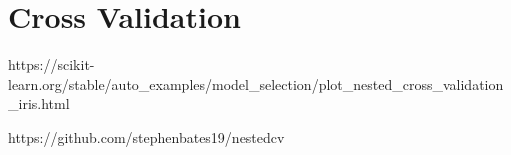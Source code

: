 \documentclass[../../main.tex]{subfiles}
\begin{document}

\section{Cross Validation}

https://scikit-learn.org/stable/auto_examples/model_selection/plot_nested_cross_validation_iris.html

https://github.com/stephenbates19/nestedcv

\end{document}
